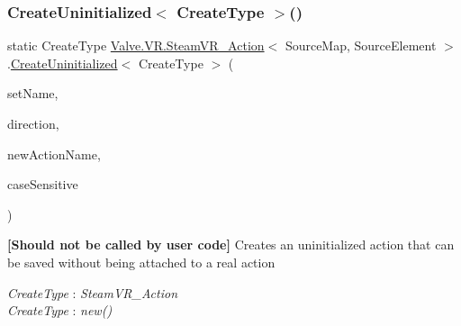 \mbox{\label{class_valve_1_1_v_r_1_1_steam_v_r___action_a22efd6a86141fef284c6de86ba31f75e}} 
\subsubsection{\texorpdfstring{CreateUninitialized$<$ CreateType $>$()}{CreateUninitialized< CreateType >()}\hspace{0.1cm}{\footnotesize\ttfamily [1/2]}}
{\footnotesize\ttfamily static Create\+Type \mbox{\hyperlink{class_valve_1_1_v_r_1_1_steam_v_r___action}{Valve.\+V\+R.\+Steam\+V\+R\+\_\+\+Action}}$<$ Source\+Map, Source\+Element $>$.\mbox{\hyperlink{class_valve_1_1_v_r_1_1_steam_v_r___action_af69bed4c4b5b9640c2cac9e118743df3}{Create\+Uninitialized}}$<$ Create\+Type $>$ (\begin{DoxyParamCaption}\item[{string}]{set\+Name,  }\item[{\mbox{\hyperlink{namespace_valve_1_1_v_r_a1e6192cb5ddaf204afab87ccb5728780}{Steam\+V\+R\+\_\+\+Action\+Directions}}}]{direction,  }\item[{string}]{new\+Action\+Name,  }\item[{bool}]{case\+Sensitive }\end{DoxyParamCaption})\hspace{0.3cm}{\ttfamily [static]}}



{\bfseries{\mbox{[}Should not be called by user code\mbox{]}}} Creates an uninitialized action that can be saved without being attached to a real action 

\begin{Desc}
\item[Type Constraints]\begin{description}
\item[{\em Create\+Type} : {\em Steam\+V\+R\+\_\+\+Action}]\item[{\em Create\+Type} : {\em new()}]\end{description}
\end{Desc}


